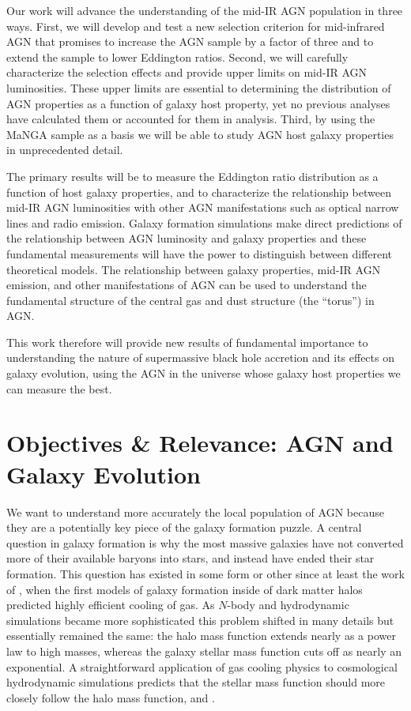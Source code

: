 \documentclass[12pt, preprint]{hacked-aastex}
\begin{document}
Our work will advance the understanding of the mid-IR AGN population
in three ways. First, we will develop and test a new selection
criterion for mid-infrared AGN that promises to increase the AGN
sample by a factor of three and to extend the sample to lower
Eddington ratios. Second, we will carefully characterize the selection
effects and provide upper limits on mid-IR AGN luminosities. These
upper limits are essential to determining the distribution of AGN
properties as a function of galaxy host property, yet no previous
analyses have calculated them or accounted for them in analysis.
Third, by using the MaNGA sample as a basis we will be able to study
AGN host galaxy properties in unprecedented detail.

The primary results will be to measure the Eddington ratio
distribution as a function of host galaxy properties, and to
characterize the relationship between mid-IR AGN luminosities with
other AGN manifestations such as optical narrow lines and radio
emission. Galaxy formation simulations make direct predictions of the
relationship between AGN luminosity and galaxy properties and these
fundamental measurements will have the power to distinguish between
different theoretical models. The relationship between galaxy
properties, mid-IR AGN emission, and other manifestations of AGN can
be used to understand the fundamental structure of the central gas and
dust structure (the ``torus'') in AGN.

This work therefore will provide new results of fundamental importance
to understanding the nature of supermassive black hole accretion and
its effects on galaxy evolution, using the AGN in the universe whose
galaxy host properties we can measure the best.

\section{Objectives \& Relevance: AGN and Galaxy Evolution}\label{sec:intro}

We want to understand more accurately the local population of AGN
because they are a potentially key piece of the galaxy formation
puzzle. A central question in galaxy formation is why the most massive
galaxies have not converted more of their available baryons into
stars, and instead have ended their star formation. This question has
existed in some form or other since at least the work of
\cite{white78a}, when the first models of galaxy formation inside of
dark matter halos predicted highly efficient cooling of gas. As
$N$-body and hydrodynamic simulations became more sophisticated this
problem shifted in many details but essentially remained the same: the
halo mass function extends nearly as a power law to high masses,
whereas the galaxy stellar mass function cuts off as nearly an
exponential.  A straightforward application of gas cooling physics to
cosmological hydrodynamic simulations predicts that the stellar mass
function should more closely follow the halo mass function, and 
\cite{benson03a, somerville15a}.
\end{document}
